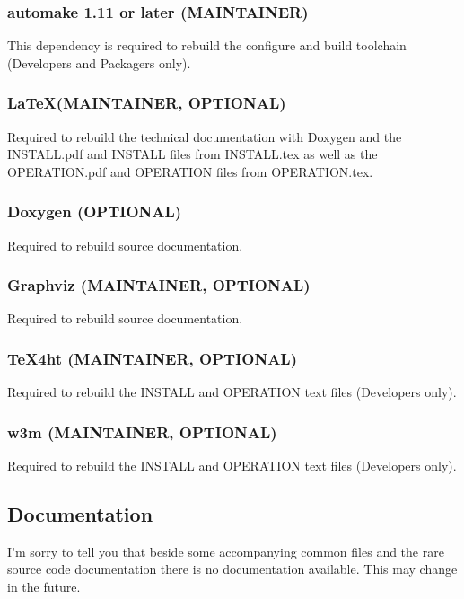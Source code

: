 \subsubsection{automake 1.11 or later (MAINTAINER)}

This dependency is required to rebuild the configure and build toolchain
(Developers and Packagers only).

\subsubsection{\LaTeX (MAINTAINER, OPTIONAL)}

Required to rebuild the technical documentation with Doxygen and the
INSTALL.pdf and INSTALL files from INSTALL.tex as well as the OPERATION.pdf
and OPERATION files from OPERATION.tex.

\subsubsection{Doxygen (OPTIONAL)}

Required to rebuild source documentation.

\subsubsection{Graphviz (MAINTAINER, OPTIONAL)}

Required to rebuild source documentation.

\subsubsection{{\TeX}4ht (MAINTAINER, OPTIONAL)}

Required to rebuild the INSTALL and OPERATION text files (Developers only).

\subsubsection{w3m (MAINTAINER, OPTIONAL)}

Required to rebuild the INSTALL and OPERATION text files (Developers only).

\subsection{Documentation}

I'm sorry to tell you that beside some accompanying common files and the
rare source code documentation there is no documentation available. This
may change in the future.

